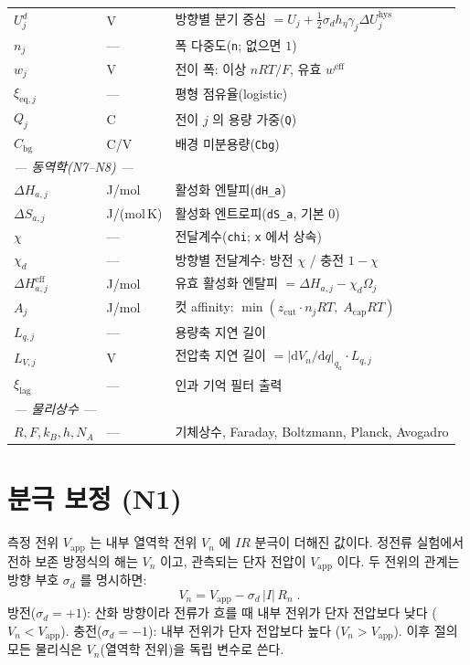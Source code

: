 \documentclass[11pt,a4paper]{article}
\newcommand{\dd}{\mathrm{d}}
\newcommand{\app}{\mathrm{app}}
\newcommand{\eq}{\mathrm{eq}}
\newcommand{\eff}{\mathrm{eff}}
\newcommand{\bg}{\mathrm{bg}}
\newcommand{\hys}{\mathrm{hys}}
\begin{document}
\begin{longtable}{p{} p{} p{}}
$U_j^d$ & V & 방향별 분기 중심 $=U_j+\tfrac12\sigma_d h_\eta\gamma_j\Delta U_j^\hys$\\
$n_j$ & --- & 폭 다중도(\texttt{n}; 없으면 $1$)\\
$w_j$ & V & 전이 폭: 이상 $nRT/F$, 유효 $w^\eff$\\
$\xi_{\eq,j}$ & --- & 평형 점유율(logistic)\\
$Q_j$ & C & 전이 $j$ 의 용량 가중(\texttt{Q})\\
$C_\bg$ & C/V & 배경 미분용량(\texttt{Cbg})\\
\multicolumn{3}{l}{\emph{--- 동역학(N7--N8) ---}}\\
$\Delta H_{a,j}$ & J/mol & 활성화 엔탈피(\texttt{dH\_a})\\
$\Delta S_{a,j}$ & J/(mol\,K) & 활성화 엔트로피(\texttt{dS\_a}, 기본 0)\\
$\chi$ & --- & 전달계수(\texttt{chi}; \texttt{x} 에서 상속)\\
$\chi_d$ & --- & 방향별 전달계수: 방전 $\chi$ / 충전 $1-\chi$\\
$\Delta H_{a,j}^\eff$ & J/mol & 유효 활성화 엔탈피 $=\Delta H_{a,j}-\chi_d\Omega_j$\\
$A_j$ & J/mol & 컷 affinity: $\min(z_\mathrm{cut}\cdot n_jRT,\;A_\mathrm{cap}RT)$\\
$L_{q,j}$ & --- & 용량축 지연 길이\\
$L_{V,j}$ & V & 전압축 지연 길이 $=|\dd V_n/\dd q|_{q_a}\cdot L_{q,j}$\\
$\xi_\mathrm{lag}$ & --- & 인과 기억 필터 출력\\
\multicolumn{3}{l}{\emph{--- 물리상수 ---}}\\
$R,F,k_B,h,N_A$ & --- & 기체상수, Faraday, Boltzmann, Planck, Avogadro\\
\bottomrule
\end{longtable}

\section{분극 보정 (N1)}\label{sec:polcorr}

측정 전위 $V_\app$ 는 내부 열역학 전위 $V_n$ 에 $IR$ 분극이 더해진 값이다.
정전류 실험에서 전하 보존 방정식의 해는 $V_n$ 이고, 관측되는 단자 전압이
$V_\app$ 이다. 두 전위의 관계는 방향 부호 $\sigma_d$ 를 명시하면:
\begin{equation}
\boxed{\;V_n = V_\app - \sigma_d\,|I|\,R_n\;.}
\label{eq:vn}
\end{equation}
방전($\sigma_d=+1$): 산화 방향이라 전류가 흐를 때 내부 전위가 단자 전압보다 낮다
($V_n < V_\app$). 충전($\sigma_d=-1$): 내부 전위가 단자 전압보다 높다
($V_n > V_\app$). 이후 절의 모든 물리식은 $V_n$(열역학 전위)을 독립 변수로 쓴다.
\end{document}
